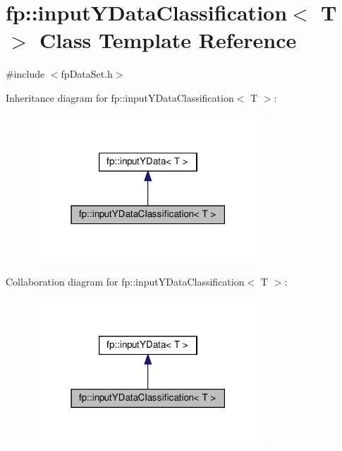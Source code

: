 \hypertarget{classfp_1_1inputYDataClassification}{}\section{fp\+:\+:input\+Y\+Data\+Classification$<$ T $>$ Class Template Reference}
\label{classfp_1_1inputYDataClassification}


{\ttfamily \#include $<$fp\+Data\+Set.\+h$>$}



Inheritance diagram for fp\+:\+:input\+Y\+Data\+Classification$<$ T $>$\+:
\nopagebreak
\begin{figure}[H]
\begin{center}
\leavevmode
\includegraphics[width=243pt]{classfp_1_1inputYDataClassification__inherit__graph}
\end{center}
\end{figure}


Collaboration diagram for fp\+:\+:input\+Y\+Data\+Classification$<$ T $>$\+:
\nopagebreak
\begin{figure}[H]
\begin{center}
\leavevmode
\includegraphics[width=243pt]{classfp_1_1inputYDataClassification__coll__graph}
\end{center}
\end{figure}
